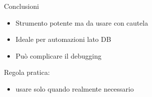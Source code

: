 \documentclass{beamer}
\begin{document}
	\begin{frame}{Conclusioni}
		\begin{itemize}
			\item Strumento potente ma da usare con cautela
			\item Ideale per automazioni lato DB
			\item Può complicare il debugging
		\end{itemize}
		
		\bigskip
		
		Regola pratica:
		\begin{itemize}
			\item usare solo quando realmente necessario
		\end{itemize}
	\end{frame}
	
\end{document}
